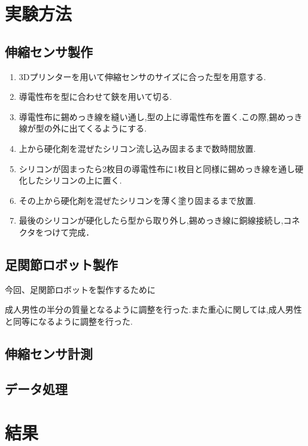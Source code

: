 \section{実験方法}
\subsection{伸縮センサ製作}
\begin{enumerate}
    \item 3Dプリンターを用いて伸縮センサのサイズに合った型を用意する.
    \item 導電性布を型に合わせて鋏を用いて切る.
    \item 導電性布に錫めっき線を縫い通し,型の上に導電性布を置く.この際,錫めっき線が型の外に出てくるようにする.
    \item 上から硬化剤を混ぜたシリコン流し込み固まるまで数時間放置.
    \item シリコンが固まったら2枚目の導電性布に1枚目と同様に錫めっき線を通し硬化したシリコンの上に置く.
    \item その上から硬化剤を混ぜたシリコンを薄く塗り固まるまで放置.
    \item 最後のシリコンが硬化したら型から取り外し,錫めっき線に銅線接続し,コネクタをつけて完成．
\end{enumerate}
\subsection{足関節ロボット製作}
今回、足関節ロボットを製作するために

成人男性の半分の質量となるように調整を行った.また重心に関しては,成人男性と同等になるように調整を行った.
\subsection{伸縮センサ計測}
\subsection{データ処理}

\section{結果}
